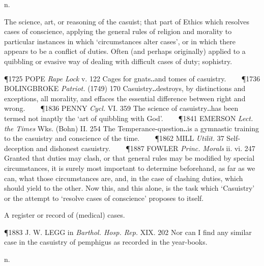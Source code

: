 \begin{description}[wide, labelwidth=!, labelindent=0pt]
 n.

\noindent {}

\noindent [f. casuist + -ry. App. at first contemptuous = ‘the casuist's trade’; cf. sophistry, Jesuitry, foolery. A term of more respectful application would prob. have been casuism: Fr. has la casuistique, as if ‘casuistics’.]

\begin{myenumerate}
 The science, art, or reasoning of the casuist; that part of Ethics which resolves cases of conscience, applying the general rules of religion and morality to particular instances in which ‘circumstances alter cases’, or in which there appears to be a conflict of duties. Often (and perhaps originally) applied to a quibbling or evasive way of dealing with difficult cases of duty; sophistry.

\P 1725 POPE  \textit{Rape Lock} v. 122 Cages for gnats‥and tomes of casuistry.    
\P 1736 BOLINGBROKE  \textit{Patriot.} (1749) 170 Casuistry‥destroys, by distinctions and exceptions, all morality, and effaces the essential difference between right and wrong.    
\P 1836 PENNY  \textit{Cycl.} VI. 359 The science of casuistry‥has been termed not inaptly the ‘art of quibbling with God’.    
\P 1841 EMERSON  \textit{Lect. the Times} Wks. (Bohn) II. 254 The Temperance-question‥is a gymnastic training to the casuistry and conscience of the time.    
\P 1862 MILL  \textit{Utilit.} 37 Self-deception and dishonest casuistry.    
\P 1887 FOWLER  \textit{Princ. Morals} ii. vi. 247 Granted that duties may clash, or that general rules may be modified by special circumstances, it is surely most important to determine beforehand, as far as we can, what those circumstances are, and, in the case of clashing duties, which should yield to the other. Now this, and this alone, is the task which ‘Casuistry’ or the attempt to ‘resolve cases of conscience’ proposes to itself.

 A register or record of (medical) cases.

\P 1883 J. W. LEGG  in \textit{Barthol. Hosp. Rep.} XIX. 202 Nor can I find any similar case in the casuistry of pemphigus as recorded in the year-books.
\end{myenumerate}





 n.


\end{description}
